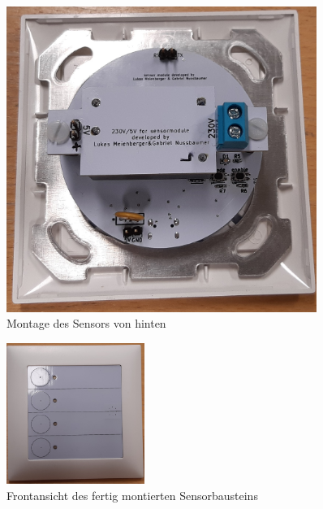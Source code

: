 \begin{figure}[htb]
\begin{minipage}[t]{0.45\linewidth}
		\includegraphics[width=0.90\textwidth]{graphics/Sensor_Einbau_hinten.jpg}
		\caption{Montage des Sensors von hinten}
		\label{pic: sensor_montage_hinten}
	\end{minipage}
\end{figure}

\begin{figure}[h!]
	\centering
	\includegraphics[width=0.4\textwidth]{graphics/Front_Einbau.jpg}
	\caption{Frontansicht des fertig montierten Sensorbausteins}
	\label{pic: sensor_montage_front}
\end{figure}





